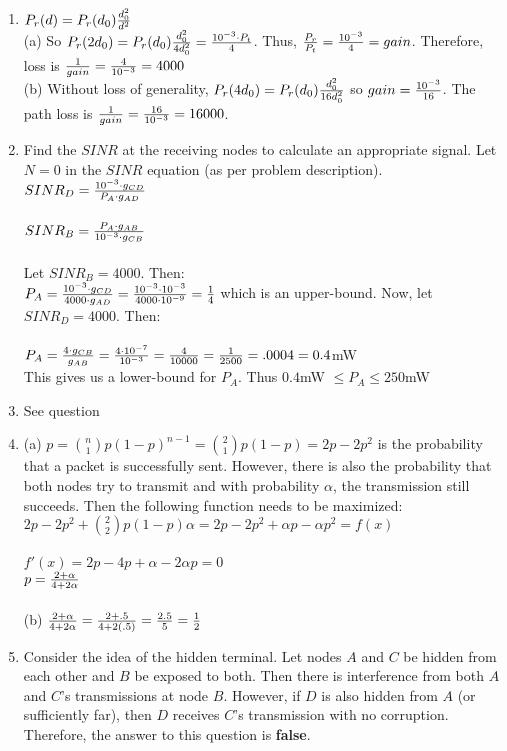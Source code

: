 \documentclass[letterpaper, 12pt]{article}
\begin{document}
\pagebreak

\begin{enumerate}
\item $P_r(d) = P_r(d_0){d_0^2 \over d^2}$ \\
(a) So $P_r(2d_0) = P_r(d_0){d_0^2 \over {4d_0^2}} = {{10^{-3} \cdot P_t} \over 4}$. Thus, ${P_r \over P_t} = {10^{-3} \over 4} = gain$. Therefore, loss is ${1 \over gain} = {4 \over 10^{-3}} = 4000$ \\
(b) Without loss of generality, $P_r(4d_0) = P_r(d_0){d_0^2 \over {16d_0^2}}$ so $gain = {{10^{-3} \over 16}}$. The path loss is ${1 \over gain} = {16 \over 10^{-3}} = 16000$.

\item Find the $SINR$ at the receiving nodes to calculate an appropriate signal. Let $N = 0$ in the $SINR$ equation (as per problem description). \\
$SINR_D = {{10^{-3}} \cdot g_{CD} \over {P_A \cdot g_{AD}}}$ \\\\
$SINR_B = {P_A \cdot {g_{AB}} \over {{10^{-3}} \cdot g_{CB}}}$ \\\\
Let $SINR_B = 4000$. Then: \\
$P_A = {{10^{-3} \cdot g_{CD}} \over {4000 \cdot g_{AD}}} = {{10^{-3} \cdot {10^{-3}}} \over {4000 \cdot {10^{-9}}}} = {1 \over 4}$ which is an upper-bound. Now, let $SINR_D = 4000$. Then: \\\\
$P_A = {{4 \cdot g_{CB}} \over {g_{AB}}} = {{4 \cdot {10^{-7}} \over {10^{-3}}}} = {4 \over 10000} = {1 \over 2500} = .0004 = 0.4$mW \\
This gives us a lower-bound for $P_A$. Thus $0.4$mW $\le P_A \le 250$mW
\item See question
\item (a) $p = {n \choose 1}p(1-p)^{n-1} = {2 \choose 1}p(1-p) = 2p - 2p^2$ is the probability that a packet is successfully sent. However, there is also the probability that both nodes try to transmit and with probability $\alpha$, the transmission still succeeds. Then the following function needs to be maximized: \\
$2p - 2p^2 + {2 \choose 2}p(1-p)\alpha = 2p - 2p^2 + \alpha p - \alpha p^2 = f(x)$ \\\\
$f'(x) = 2p - 4p + \alpha - 2\alpha p = 0$ \\
$p = {{2 + \alpha} \over {4 + 2\alpha}}$ \\\\
(b) ${{2 + \alpha} \over {4 + 2\alpha}} =  {{2 + .5} \over {4 + 2(.5)}} = {2.5 \over 5} = {1 \over 2}$

\item Consider the idea of the hidden terminal. Let nodes $A$ and $C$ be hidden from each other and $B$ be exposed to both. Then there is interference from both $A$ and $C$'s transmissions at node $B$. However, if $D$ is also hidden from $A$ (or sufficiently far), then $D$ receives $C$'s transmission with no corruption. Therefore, the answer to this question is \textbf{false}.
\end{enumerate}
\end{document}
